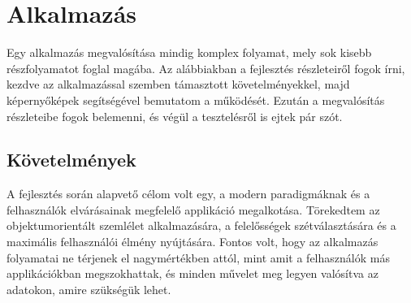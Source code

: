 \chapter{Alkalmazás}

Egy alkalmazás megvalósítása mindig komplex folyamat, mely sok kisebb részfolyamatot foglal magába. Az alábbiakban a fejlesztés részleteiről fogok írni, kezdve az alkalmazással szemben támasztott követelményekkel, majd képernyőképek segítségével bemutatom a működését. Ezután a megvalósítás részleteibe fogok belemenni, és végül a tesztelésről is ejtek pár szót.

\section{Követelmények}

A fejlesztés során alapvető célom volt egy, a modern paradigmáknak és a felhasználók elvárásainak megfelelő applikáció megalkotása. Törekedtem az objektumorientált szemlélet alkalmazására, a felelősségek szétválasztására és a maximális felhasználói élmény nyújtására. Fontos volt, hogy az alkalmazás folyamatai ne térjenek el nagymértékben attól, mint amit a felhasználók más applikációkban megszokhattak, és minden művelet meg legyen valósítva az adatokon, amire szükségük lehet.

